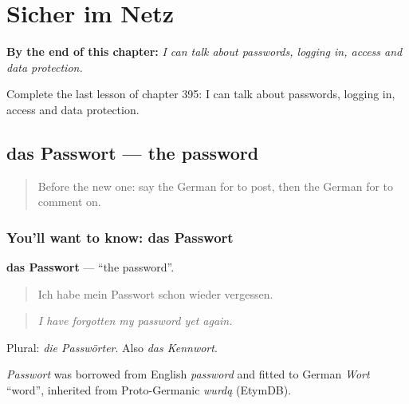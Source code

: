 
\chapter{Sicher im Netz}
\label{ch:ge-sicher-im-netz}

\begin{chapteropening}
\textbf{By the end of this chapter:} \emph{I can talk about passwords, logging in, access and data protection.}

Complete the last lesson of chapter 395: I can talk about passwords, logging in, access and data protection.
\end{chapteropening}

\section[das Passwort]{das Passwort — the password}

\label{lesson:GE-C395-passwort}



\begin{quote}
Before the new one: say the German for to post, then the German for to comment on.
\end{quote}

\subsection*{You'll want to know: das Passwort}
\textbf{das Passwort} — \textquotedblleft{}the password\textquotedblright{}.

\begin{quote}
Ich habe mein Passwort schon wieder vergessen.
\end{quote}

\begin{quote}
\emph{I have forgotten my password yet again.}
\end{quote}

Plural: \emph{die Passwörter}. Also \emph{das Kennwort}.

\begin{cousinweb}
\emph{Passwort} was borrowed from English \emph{password} and fitted to German \emph{Wort} \textquotedblleft{}word\textquotedblright{}, inherited from Proto-Germanic \emph{wurdą} (EtymDB).
\end{cousinweb}

